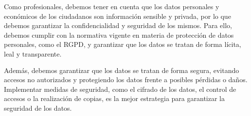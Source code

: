 Como profesionales, debemos tener en cuenta que los datos personales y económicos de los ciudadanos
son información sensible y privada, por lo que debemos garantizar la confidencialidad y seguridad
de los mismos. Para ello, debemos cumplir con la normativa vigente en materia de protección de datos
personales, como el RGPD, y garantizar que los datos se tratan de forma lícita, leal y transparente.

Además, debemos garantizar que los datos se tratan de forma segura, evitando accesos no autorizados
y protegiendo los datos frente a posibles pérdidas o daños. Implementar medidas de seguridad, como
el cifrado de los datos, el control de accesos o la realización de copias, es la mejor estrategia
para garantizar la seguridad de los datos.
